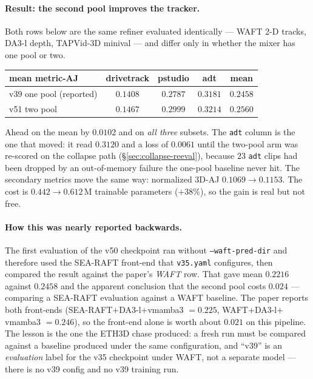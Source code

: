 \documentclass[11pt,a4paper]{article}
\begin{document}
\paragraph{Result: the second pool improves the tracker.} Both rows below are the same refiner
evaluated identically --- WAFT 2-D tracks, DA3-l depth, TAPVid-3D minival --- and differ only in
whether the mixer has one pool or two.

\begin{center}
\begin{tabular}{lcccc}
\toprule
mean metric-AJ & drivetrack & pstudio & adt & mean \\
\midrule
v39 \; one pool (reported)  & $0.1408$ & $0.2787$ & $0.3181$ & $0.2458$ \\
v51 \; two pool             & $\mathbf{0.1467}$ & $\mathbf{0.2999}$ & $\mathbf{0.3214}$ & $\mathbf{0.2560}$ \\
\bottomrule
\end{tabular}
\end{center}

\noindent Ahead on the mean by $0.0102$ and on \emph{all three} subsets. The \texttt{adt} column is
the one that moved: it read $0.3120$ and a loss of $0.0061$ until the two-pool arm was re-scored on
the collapse path (\S\ref{sec:collapse-reeval}), because $23$ \texttt{adt} clips had been dropped by
an out-of-memory failure the one-pool baseline never hit. The secondary metrics move the same way:
normalized 3D-AJ $0.1069\to0.1153$. The cost is $0.442\to0.612$\,M trainable
parameters ($+38\%$), so the gain is real but not free.

\paragraph{How this was nearly reported backwards.} The first evaluation of the v50 checkpoint ran
without \texttt{--waft-pred-dir} and therefore used the SEA-RAFT front-end that \texttt{v35.yaml}
configures, then compared the result against the paper's \emph{WAFT} row. That gave mean $0.2216$
against $0.2458$ and the apparent conclusion that the second pool costs $0.024$ --- comparing a
SEA-RAFT evaluation against a WAFT baseline. The paper reports both front-ends
(SEA-RAFT$+$DA3-l$+$vmamba3 $=0.225$, WAFT$+$DA3-l$+$vmamba3 $=0.246$), so the front-end alone is
worth about $0.021$ on this pipeline. The lesson is the one the ETH3D chase produced: a fresh run
must be compared against a baseline produced under the same configuration, and ``v39'' is an
\emph{evaluation} label for the v35 checkpoint under WAFT, not a separate model --- there is no
v39 config and no v39 training run.
\end{document}
